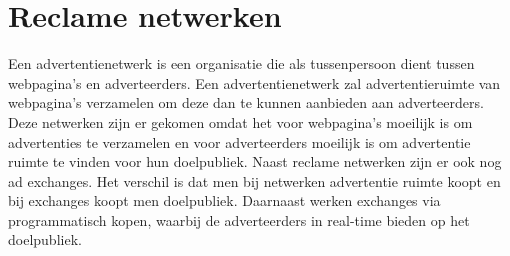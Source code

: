 \documentclass[pdftex,a4paper,12pt,twoside]{report}
\begin{document}
\section{Reclame netwerken}
\label{sec:Reclame netwerken}
Een advertentienetwerk is een organisatie die als tussenpersoon dient tussen webpagina's en adverteerders. Een advertentienetwerk zal advertentieruimte van webpagina's verzamelen om deze dan te kunnen aanbieden aan adverteerders. Deze netwerken zijn er gekomen omdat het voor webpagina's moeilijk is om advertenties te verzamelen en voor adverteerders moeilijk is om advertentie ruimte te vinden voor hun doelpubliek. Naast reclame netwerken zijn er ook nog ad exchanges. Het verschil is dat men bij netwerken advertentie ruimte koopt en bij exchanges koopt men doelpubliek. Daarnaast werken exchanges via programmatisch kopen, waarbij de adverteerders in real-time bieden op het doelpubliek.
\end{document}
